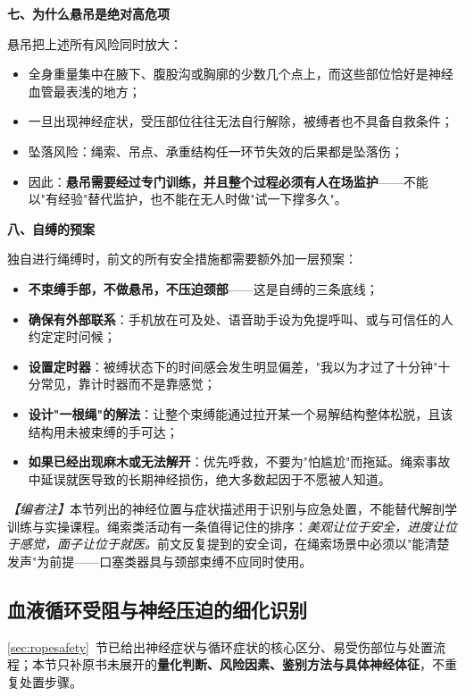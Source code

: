 \documentclass[12pt,UTF8]{ctexbook}
\begin{document}
\textbf{七、为什么悬吊是绝对高危项}

悬吊把上述所有风险同时放大：

\begin{itemize}
\item 全身重量集中在腋下、腹股沟或胸廓的少数几个点上，而这些部位恰好是神经血管最表浅的地方；
\item 一旦出现神经症状，受压部位往往无法自行解除，被缚者也不具备自救条件；
\item 坠落风险：绳索、吊点、承重结构任一环节失效的后果都是坠落伤；
\item 因此：\textbf{悬吊需要经过专门训练，并且整个过程必须有人在场监护}——不能以"有经验"替代监护，也不能在无人时做"试一下撑多久"。
\end{itemize}

\textbf{八、自缚的预案}

独自进行绳缚时，前文的所有安全措施都需要额外加一层预案：

\begin{itemize}
\item \textbf{不束缚手部，不做悬吊，不压迫颈部}——这是自缚的三条底线；
\item \textbf{确保有外部联系}：手机放在可及处、语音助手设为免提呼叫、或与可信任的人约定定时问候；
\item \textbf{设置定时器}：被缚状态下的时间感会发生明显偏差，"我以为才过了十分钟"十分常见，靠计时器而不是靠感觉；
\item \textbf{设计"一根绳"的解法}：让整个束缚能通过拉开某一个易解结构整体松脱，且该结构用未被束缚的手可达；
\item \textbf{如果已经出现麻木或无法解开}：优先呼救，不要为"怕尴尬"而拖延。绳索事故中延误就医导致的长期神经损伤，绝大多数起因于不愿被人知道。
\end{itemize}

\textit{【编者注】}本节列出的神经位置与症状描述用于识别与应急处置，不能替代解剖学训练与实操课程。绳索类活动有一条值得记住的排序：\emph{美观让位于安全，进度让位于感觉，面子让位于就医。}前文反复提到的安全词，在绳索场景中必须以"能清楚发声"为前提——口塞类器具与颈部束缚不应同时使用。

\subsection{血液循环受阻与神经压迫的细化识别}\label{sec:roperiskdetail}

\ref{sec:ropesafety}~节已给出神经症状与循环症状的核心区分、易受伤部位与处置流程；本节只补原书未展开的\textbf{量化判断、风险因素、鉴别方法与具体神经体征}，不重复处置步骤。
\end{document}
